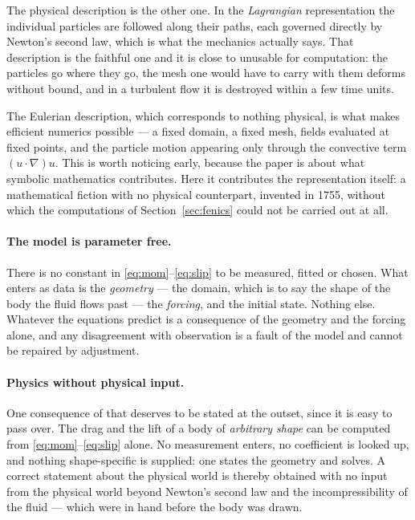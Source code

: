 \documentclass[11pt]{article}
\newcommand{\grad}{\nabla}
\begin{document}
The physical description is the other one. In the \emph{Lagrangian} representation the individual
particles are followed along their paths, each governed directly by Newton's second law, which is
what the mechanics actually says. That description is the faithful one and it is close to
unusable for computation: the particles go where they go, the mesh one would have to carry with them
deforms without bound, and in a turbulent flow it is destroyed within a few time units.

The Eulerian description, which corresponds to nothing physical, is what makes efficient numerics
possible --- a fixed domain, a fixed mesh, fields evaluated at fixed points, and the particle motion
appearing only through the convective term $(u\cdot\grad)u$. This is worth noticing early, because
the paper is about what symbolic mathematics contributes. Here it contributes the representation
itself: a mathematical fiction with no physical counterpart, invented in 1755, without which the
computations of Section~\ref{sec:fenics} could not be carried out at all.

\paragraph{The model is parameter free.} There is no constant in
\eqref{eq:mom}--\eqref{eq:slip} to be measured, fitted or chosen. What enters as data is the
\emph{geometry} --- the domain, which is to say the shape of the body the fluid flows past --- the
\emph{forcing}, and the initial state. Nothing else. Whatever the equations predict is a consequence
of the geometry and the forcing alone, and any disagreement with observation is a fault of the model
and cannot be repaired by adjustment.

\paragraph{Physics without physical input.} One consequence of that deserves to be stated at the
outset, since it is easy to pass over. The drag and the lift of a body of \emph{arbitrary shape} can
be computed from \eqref{eq:mom}--\eqref{eq:slip} alone. No measurement enters, no coefficient is
looked up, and nothing shape-specific is supplied: one states the geometry and solves. A correct
statement about the physical world is thereby obtained with no input from the physical world beyond
Newton's second law and the incompressibility of the fluid --- which were in hand before the body was
drawn.
\end{document}
